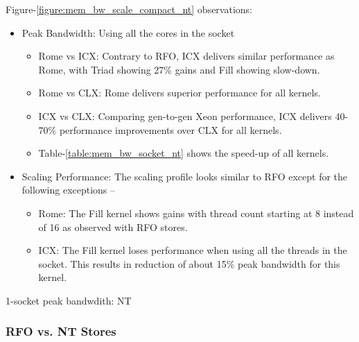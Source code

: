 \documentclass{article}
\begin{document}
Figure-\ref{figure:mem_bw_scale_compact_nt} observations:
\begin{itemize}
\item Peak Bandwidth: Using all the cores in the socket
\begin{itemize}
\item Rome vs ICX: Contrary to RFO, ICX delivers similar performance as Rome, with Triad showing 27\% gains and Fill showing slow-down.
\item Rome vs CLX: Rome delivers superior performance for all kernels.
\item ICX vs CLX: Comparing gen-to-gen Xeon performance, ICX delivers 40-70\% performance improvements over CLX for all kernels.
\item Table-\ref{table:mem_bw_socket_nt} shows the speed-up of all kernels.
\end{itemize}
\item Scaling Performance: The scaling profile looks similar to RFO except for the following exceptions --
\begin{itemize}
\item Rome: The Fill kernel shows gains with thread count starting at 8 instead of 16 as observed with RFO stores.
\item ICX: The Fill kernel loses performance when using all the threads in the socket. This results in reduction of about 15\% peak bandwidth for this kernel.
\end{itemize}
\end{itemize}

\begin{table}[h!]
\centering

\caption{1-socket peak bandwdith: NT}
\label{table:mem_bw_socket_nt}
\end{table}


\subsubsection{RFO vs. NT Stores}
\end{document}

